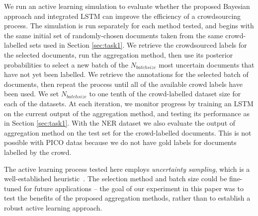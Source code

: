 We run an active learning simulation to evaluate whether the proposed Bayesian approach and integrated LSTM
can improve the efficiency of a crowdsourcing process. 
The simulation is run separately for each method tested, and begins with the same initial set of randomly-chosen
documents taken from the same crowd-labelled sets used in Section \ref{sec:task1}.
We retrieve the crowdsourced labels for the selected documents, run the aggregation method,
then use its posterior probabilities to select a new batch of the $N_{batchsize}$ most uncertain documents that have not yet been labelled. 
We retrieve the annotations for the selected batch of documents, then repeat the process until
all of the available crowd labels have been used.
We set $N_{batchsize}$ to one tenth of the crowd-labelled dataset size for each of the datasets. At each iteration,
we monitor progress by training an LSTM on the current output of the aggregation method, 
and testing its performance as in Section \ref{sec:task1}. 
With the NER dataset we also evaluate the output of aggregation method on the test set for the crowd-labelled documents. 
This is not possible with PICO datas because we do not have gold labels for documents labelled by the crowd.

The active learning process tested here employs \emph{uncertainty sampling}, which is a 
well-established heuristic~\cite{settles2010active}. 
The selection method and batch size could be fine-tuned for future applications -- the 
goal of our experiment in this paper was to test the benefits of the proposed aggregation methods,
rather than to establish a robust active learning approach.


